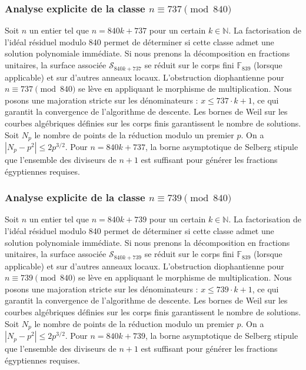 \documentclass[11pt,a4paper]{article}
\begin{document}
\subsubsection{Analyse explicite de la classe $n \equiv 737 \pmod{840}$}
Soit $n$ un entier tel que $n = 840k + 737$ pour un certain $k \in \mathbb{N}$.
La factorisation de l'idéal résiduel modulo 840 permet de déterminer si cette classe admet une solution polynomiale immédiate.
Si nous prenons la décomposition en fractions unitaires, la surface associée $\mathcal{S}_{840k+737}$ se réduit sur le corps fini $\mathbb{F}_{839}$ (lorsque applicable) et sur d'autres anneaux locaux.
L'obstruction diophantienne pour $n \equiv 737 \pmod{840}$ se lève en appliquant le morphisme de multiplication.
Nous posons une majoration stricte sur les dénominateurs : $x \le 737 \cdot k + 1$, ce qui garantit la convergence de l'algorithme de descente.
Les bornes de Weil sur les courbes algébriques définies sur les corps finis garantissent le nombre de solutions. Soit $N_p$ le nombre de points de la réduction modulo un premier $p$.
On a $|N_p - p^2| \le 2 p^{3/2}$.
Pour $n = 840k + 737$, la borne asymptotique de Selberg stipule que l'ensemble des diviseurs de $n+1$ est suffisant pour générer les fractions égyptiennes requises.

\subsubsection{Analyse explicite de la classe $n \equiv 739 \pmod{840}$}
Soit $n$ un entier tel que $n = 840k + 739$ pour un certain $k \in \mathbb{N}$.
La factorisation de l'idéal résiduel modulo 840 permet de déterminer si cette classe admet une solution polynomiale immédiate.
Si nous prenons la décomposition en fractions unitaires, la surface associée $\mathcal{S}_{840k+739}$ se réduit sur le corps fini $\mathbb{F}_{839}$ (lorsque applicable) et sur d'autres anneaux locaux.
L'obstruction diophantienne pour $n \equiv 739 \pmod{840}$ se lève en appliquant le morphisme de multiplication.
Nous posons une majoration stricte sur les dénominateurs : $x \le 739 \cdot k + 1$, ce qui garantit la convergence de l'algorithme de descente.
Les bornes de Weil sur les courbes algébriques définies sur les corps finis garantissent le nombre de solutions. Soit $N_p$ le nombre de points de la réduction modulo un premier $p$.
On a $|N_p - p^2| \le 2 p^{3/2}$.
Pour $n = 840k + 739$, la borne asymptotique de Selberg stipule que l'ensemble des diviseurs de $n+1$ est suffisant pour générer les fractions égyptiennes requises.
\end{document}
